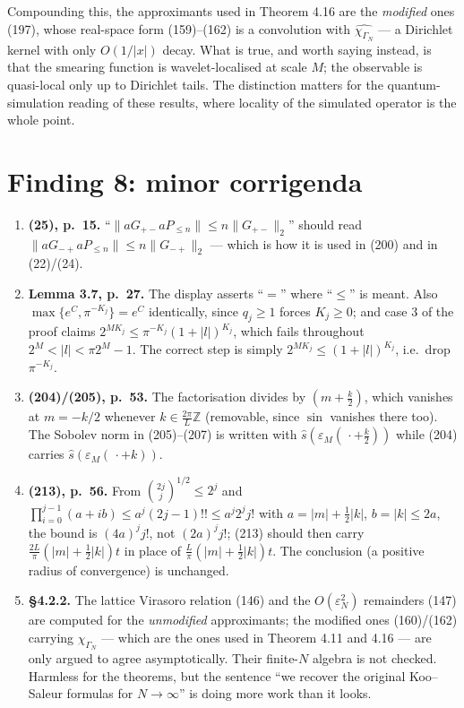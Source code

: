 \documentclass[11pt,a4paper]{article}
\theoremstyle{definition}
\newcommand{\eps}{\varepsilon}
\newcommand{\sh}{\hat{s}}
\begin{document}
\noindent
Compounding this, the approximants used in Theorem 4.16 are the \emph{modified} ones (197),
whose real-space form (159)--(162) is a convolution with $\widehat{\chi_{\Gamma_N}}$ --- a
Dirichlet kernel with only $O(1/|x|)$ decay. What is true, and worth saying instead, is that
the smearing function is wavelet-localised at scale $M$; the observable is quasi-local only up
to Dirichlet tails. The distinction matters for the quantum-simulation reading of these results,
where locality of the simulated operator is the whole point.

\section{Finding 8: minor corrigenda}

\begin{enumerate}[leftmargin=1.7em,itemsep=2pt]
\item \textbf{(25), p.~15.} ``$\|aG_{+-}aP_{\le n}\|\le n\|G_{+-}\|_2$'' should read
$\|aG_{-+}aP_{\le n}\|\le n\|G_{-+}\|_2$ --- which is how it is used in (200) and in (22)/(24).
\item \textbf{Lemma 3.7, p.~27.} The display asserts ``$=$'' where ``$\le$'' is meant. Also
$\max\{e^C,\pi^{-K_j}\}=e^C$ identically, since $q_j\ge1$ forces $K_j\ge0$; and case 3 of the
proof claims $2^{MK_j}\le\pi^{-K_j}(1+|l|)^{K_j}$, which fails throughout
$2^M<|l|<\pi2^M-1$. The correct step is simply $2^{MK_j}\le(1+|l|)^{K_j}$, i.e.\ drop
$\pi^{-K_j}$.
\item \textbf{(204)/(205), p.~53.} The factorisation divides by $(m+\tfrac k2)$, which vanishes
at $m=-k/2$ whenever $k\in\frac{2\pi}{L}\mathbb Z$ (removable, since $\sin$ vanishes there too).
The Sobolev norm in (205)--(207) is written with $\sh(\eps_M(\,\cdot+\tfrac k2))$ while (204)
carries $\sh(\eps_M(\,\cdot+k))$.
\item \textbf{(213), p.~56.} From $\binom{2j}{j}^{1/2}\le2^j$ and
$\prod_{i=0}^{j-1}(a+ib)\le a^j(2j-1)!!\le a^j2^jj!$ with $a=|m|+\tfrac12|k|$, $b=|k|\le2a$, the
bound is $(4a)^jj!$, not $(2a)^jj!$; (213) should then carry $\frac{2L}{\pi}(|m|+\frac12|k|)t$
in place of $\frac L\pi(|m|+\frac12|k|)t$. The conclusion (a positive radius of convergence) is
unchanged.
\item \textbf{§4.2.2.} The lattice Virasoro relation (146) and the $O(\eps_N^2)$ remainders
(147) are computed for the \emph{unmodified} approximants; the modified ones (160)/(162)
carrying $\chi_{\Gamma_N}$ --- which are the ones used in Theorem 4.11 and 4.16 --- are only
argued to agree asymptotically. Their finite-$N$ algebra is not checked. Harmless for the
theorems, but the sentence ``we recover the original Koo--Saleur formulas for $N\to\infty$''
is doing more work than it looks.
\end{enumerate}
\end{document}
